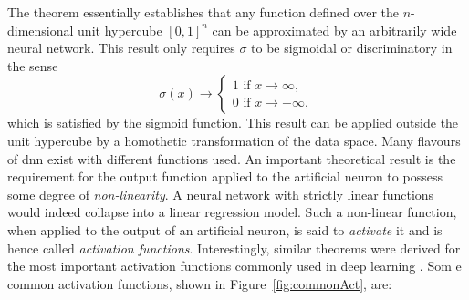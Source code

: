 The theorem essentially establishes that any function defined over the $n$-dimensional unit hypercube $[0, 1]^n$ can be approximated by an arbitrarily wide neural network. This result only requires $\sigma$ to be sigmoidal or discriminatory in the sense
\begin{equation}
    \sigma(x) \rightarrow
    \begin{cases}
        1 \text{ if } x \rightarrow \infty,  \\
        0 \text{ if } x \rightarrow -\infty,
    \end{cases}
\end{equation}
which is satisfied by the sigmoid function. This result can be applied outside the unit hypercube by a homothetic transformation of the data space. Many flavours of \gls{dnn} exist with different functions used. An important theoretical result is the requirement for the output function applied to the artificial neuron to possess some degree of \textit{non-linearity}. A neural network with strictly linear functions would indeed collapse into a linear regression model. Such a non-linear function, when applied to the output of an artificial neuron, is said to \textit{activate} it and is hence called \textit{activation functions}. Interestingly, similar theorems were derived for the most important activation functions commonly used in deep learning \cite{universApproximator-Relu}. Som e common activation functions, shown in Figure~\ref{fig:commonAct}, are:

